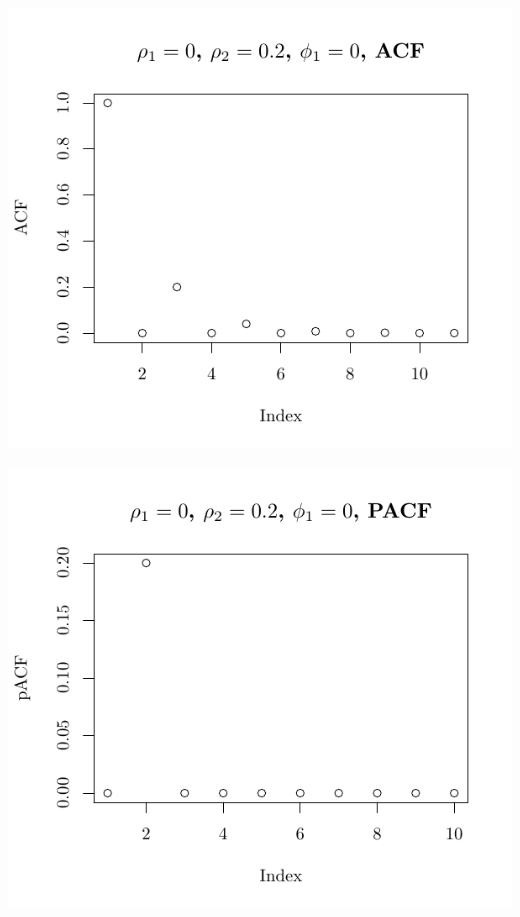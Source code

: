 \documentclass[10pt]{paper}\usepackage[]{graphicx}\usepackage[]{color}
\makeatletter
\def\maxwidth{ %
  \ifdim\Gin@nat@width>\linewidth
    \linewidth
  \else
    \Gin@nat@width
  \fi
}
\newenvironment{knitrout}{}{} %
\makeatother
\begin{document}
\begin{knitrout}
{\centering \includegraphics[width=\maxwidth]{figure/graphics-plotter-45} 

}




{\centering \includegraphics[width=\maxwidth]{figure/graphics-plotter-46} 

}





\end{knitrout}
\end{document}

